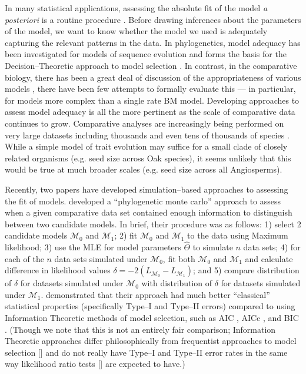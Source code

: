 \documentclass[12pt]{article}
\begin{document}
In many statistical applications, assessing the absolute fit of the model \textit{a posteriori} is a routine procedure \citep{Gelmanbook}. Before drawing inferences about the parameters of the model, we want to know whether the model we used is adequately capturing the relevant patterns in the data. In phylogenetics, model adequacy has been investigated for models of sequence evolution \citep[e.g.][]{GautLewis1995, SullivanSwofford, Goldman, HuelsenbeckBull1996, SandersonKim, Bollback2002, Ripplinger2010, Lewis2013, Brown2013} and forms the basis for the Decision--Theoretic approach to model selection \citep{Minin2003, Abdo2005, SullivanJoyce2005}. In contrast, in the comparative biology, there has been a great deal of discussion of the appropriateness of various models \citep[e.g.][]{Felsenstein1985, Felsenstein1988, HarveyPagel1991, Pagel1993, Diaz1996, Price1997, GarlandIves2000, Rohlf2006, Freckleton2009, Hansen2012}, there have been few attempts to formally evaluate this --- in particular, for models more complex than a single rate BM model. Developing approaches to assess model adequacy is all the more pertinent as the scale of comparative data continues to grow. Comparative analyses are increasingly being performed on very large datasets including thousands and even tens of thousands of species \citep[e.g.][]{Coopermammal, Jetz2012, Rabosky2013, Cornwell2013, Zanne2013}. While a simple model of trait evolution may suffice for a small clade of closely related organisms (e.g. seed size across Oak species), it seems unlikely that this would be true at much broader scales (e.g. seed size across all Angiosperms).

Recently, two papers have developed simulation--based approaches to assessing the fit of models. \citet{Boettiger2012} developed a ``phylogenetic monte carlo'' approach to assess when a given comparative data set contained enough information to distinguish between two candidate models. In brief, their procedure was as follows: 1) select 2 candidate models $\mathcal{M}_0$ and $\mathcal{M}_1$; 2) fit $\mathcal{M}_0$ and $\mathcal{M}_1$ to the data using Maximum likelihood; 3) use the MLE for model parameters $\hat{\Theta}$ to simulate $n$ data sets; 4) for each of the $n$ data sets simulated under $\mathcal{M}_0$, fit both $\mathcal{M}_0$ and $\mathcal{M}_1$ and calculate difference in likelihood values $\delta = -2(L_{\mathcal{M}_0} - L_{\mathcal{M}_1})$; and 5) compare distribution of $\delta$ for datasets simulated under $\mathcal{M}_0$ with distribution of $\delta$ for datasets simulated under $\mathcal{M}_1$. \citet{Boettiger2012} demonstrated that their approach had much better ``classical'' statistical properties (specifically Type--I and Type--II errors) compared to using Information Theoretic methods of model selection, such as AIC \citep{Akaike1973}, AICc \citep{AICC}, and BIC \citep{Schwarz1978}. (Though we note that this is not an entirely fair comparison; Information Theoretic approaches differ philosophically from frequentist approaches to model selection [\citealt{BA2004}] and do not really have Type--I and Type--II error rates in the same way likelihood ratio tests [\citealt{Wilks1938}] are expected to have.)
\end{document}
